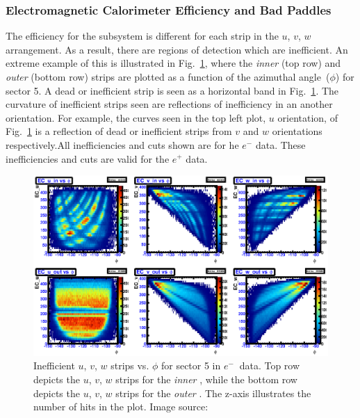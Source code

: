 \subsubsection{\label{sec:calib.ec.eff}Electromagnetic Calorimeter Efficiency and Bad Paddles}
The efficiency for the  subsystem is different for each strip in the $u$, $v$, $w$ arrangement. As a result, there are regions of detection which are inefficient. An extreme example of this is illustrated in Fig.~\ref{fig:neg:ec.sec5}, where the  \emph{inner} (top row) and \emph{outer} (bottom row) strips are plotted as a function of the azimuthal angle~($\phi$) for sector 5. A dead or inefficient strip is seen as a horizontal band in Fig.~\ref{fig:neg:ec.sec5}.  The curvature of inefficient strips seen are reflections of inefficiency in an another orientation. For example, the curves seen in the top left plot, $u$ orientation, of Fig.~\ref{fig:neg:ec.sec5} is a reflection of dead or inefficient strips from $v$ and $w$ orientations respectively.All inefficiencies and cuts shown are for he $e^-$ data. These inefficiencies and cuts are valid for the $e^+$ data.
%
\begin{figure}[h!]\begin{center}
\includegraphics[width=\figwidth,height=\hfigheight]{figures/calib/ec/pim_ecuvw_phi_NOKnockout_sec5.eps}
\caption[Inefficient  $u$, $v$, $w$ strips vs. $\phi$ for sector 5 in  $e^{-} \ $ data]{\label{fig:neg:ec.sec5}Inefficient  $u$, $v$, $w$ strips vs. $\phi$ for sector 5 in  $e^{-} \ $ data. Top row depicts the $u$, $v$, $w$ strips for the \emph{inner} , while the bottom row depicts the $u$, $v$, $w$ strips for the \emph{outer} . The z-axis illustrates the number of hits in the plot. Image source:~\cite{clas.thesis.kunkel}}
\end{center}\end{figure}

